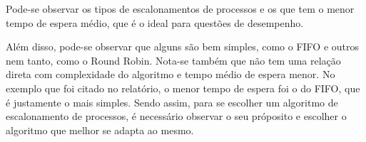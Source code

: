 \documentclass[times, 10pt,twocolumn]{article}
\begin{document}
    Pode-se observar os tipos de escalonamentos de processos e os que tem o menor tempo de espera médio, que é o ideal para questões de desempenho.
    
    Além disso, pode-se observar que alguns são bem simples, como o FIFO e outros nem tanto, como o Round Robin. Nota-se também que não tem uma relação direta com complexidade do algoritmo e tempo médio de espera menor. No exemplo que foi citado no relatório, o menor tempo de espera foi o do FIFO, que é justamente o mais simples. Sendo assim, para se escolher um algoritmo de escalonamento de processos, é necessário observar o seu próposito e escolher o algoritmo que melhor se adapta ao mesmo.


\end{document}
